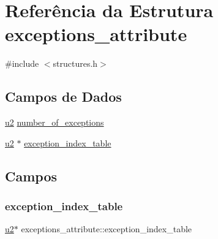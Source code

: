 \hypertarget{structexceptions__attribute}{}\section{Referência da Estrutura exceptions\+\_\+attribute}
\label{structexceptions__attribute}


{\ttfamily \#include $<$structures.\+h$>$}

\subsection*{Campos de Dados}
\begin{DoxyCompactItemize}
\item 
\hyperlink{lista__operandos_8h_a732cde1300aafb73b0ea6c2558a7a54f}{u2} \hyperlink{structexceptions__attribute_acc85fb50930b682cc98d89e2128a065a}{number\+\_\+of\+\_\+exceptions}
\item 
\hyperlink{lista__operandos_8h_a732cde1300aafb73b0ea6c2558a7a54f}{u2} $\ast$ \hyperlink{structexceptions__attribute_ae7a712d07214e739d25465f9806c514f}{exception\+\_\+index\+\_\+table}
\end{DoxyCompactItemize}


\subsection{Campos}
\mbox{\label{structexceptions__attribute_ae7a712d07214e739d25465f9806c514f}} 
\subsubsection{\texorpdfstring{exception\+\_\+index\+\_\+table}{exception\_index\_table}}
{\footnotesize\ttfamily \hyperlink{lista__operandos_8h_a732cde1300aafb73b0ea6c2558a7a54f}{u2}$\ast$ exceptions\+\_\+attribute\+::exception\+\_\+index\+\_\+table}

\mbox{\label{structexceptions__attribute_acc85fb50930b682cc98d89e2128a065a}} 
